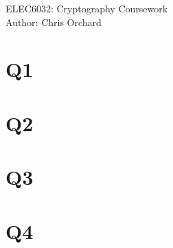 \documentclass[pdflatex, a4paper,12pt]{article}
\begin{document}
\begin{center}
{\LARGE ELEC6032: Cryptography Coursework}\\[1em]

Author: Chris Orchard\\
\end{center}

\section{Q1}
\section{Q2}
\section{Q3}
\section{Q4}
\end{document}
